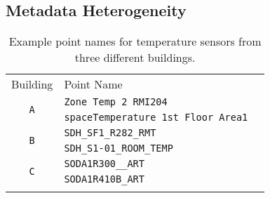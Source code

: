 


\subsection{Metadata Heterogeneity}
\begin{table}[h]
\centering
\begin{tabular}{c|ll}
\cline{1-2}
Building & Point Name & \\
\cline{1-2}
\multirow{2}{*}{\texttt{A}}  & \texttt{Zone Temp 2 RMI204} &  \\
					& \texttt{spaceTemperature 1st Floor Area1} &  \\ \cline{1-2}
\multirow{2}{*}{\texttt{B}} & \texttt{SDH\_SF1\_R282\_RMT} &  \\
                     & \texttt{SDH\_S1-01\_ROOM\_TEMP} &  \\ \cline{1-2}
\multirow{2}{*}{\texttt{C}}  & \texttt{SODA1R300\_\_ART} &  \\
					  & \texttt{SODA1R410B\_ART} &  \\ \cline{1-2}
\label{table:ex}
\end{tabular}
\caption{Example point names for temperature sensors from three different buildings.}

\end{table}


